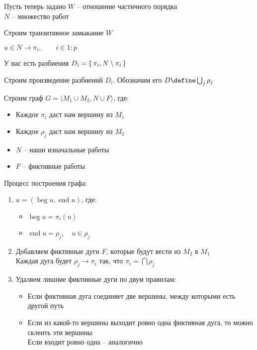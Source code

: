 Пусть теперь задано $ W $ -- отношение частичного порядка \\
$ N $ -- множество работ
\begin{algo}
	\item Строим транзитивное замыкание $ W $
    \item $ u \in N \to \pi_i, \qquad i \in 1 : p $
    \item У нас есть разбиения $ D_i = \set{\pi_i, N \setminus \pi_i} $
    \item Строим произведение разбиений $ D_i $. Обозначим его $ D \define \bigcup_j \rho_j $
    \item Строим граф $ G = \langle M_1 \cup M_2, N \cup F \rangle $, где:
    \begin{itemize}
    	\item Каждое $ \pi_i $ даст нам вершину из $ M_1 $
        \item Каждое $ \rho_j $ даст нам вершину из $ M_2 $
        \item $ N $ -- наши изначальные работы
        \item $ F $ -- фиктивные работы
    \end{itemize}
    Процесс построения графа:
    \begin{enumerate}
        \item $ u = (\operatorname{beg} u, \operatorname{end} u) $, где:
        \begin{itemize}
            \item $ \operatorname{beg} u = \pi_i(u) $
            \item $ \operatorname{end} u = \rho_j, \quad u \in \rho_j $
        \end{itemize}
        \item Добавляем фиктивные дуги $ F $, которые будут вести из $ M_2 $ в $ M_1 $ \\
        Каждая дуга будет $ \rho_j \to \pi_i $ так, что $ \pi_i = \bigcap \rho_j $
        \item Удаляем лишние фиктивные дуги по двум правилам:
        \begin{itemize}
        	\item Если фиктивная дуга соединяет две вершины, между которыми есть другой путь
            \item Если из какой-то вершины выходит ровно одна фиктивная дуга, то можно склеить эти вершины \\
            Если входит ровно одна -- аналогично
        \end{itemize}

    \end{enumerate}


\end{algo}
